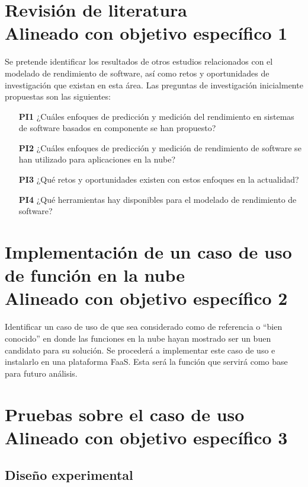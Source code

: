 ﻿\section[Revisión de literatura]{Revisión de literatura\\\small{Alineado con objetivo específico 1}}
Se pretende identificar los resultados de otros estudios relacionados con el modelado de rendimiento de software, así como retos y oportunidades de investigación que existan en esta área. Las preguntas de investigación inicialmente propuestas son las siguientes:
\begin{itemize}
    \item[\textbf{PI1}] ¿Cuáles enfoques de predicción y medición del rendimiento en sistemas de software basados en componente se han propuesto?
    \item[\textbf{PI2}] ¿Cuáles enfoques de predicción y medición de rendimiento de software se han utilizado para aplicaciones en la nube?
    \item[\textbf{PI3}] ¿Qué retos y oportunidades existen con estos enfoques en la actualidad?
    \item[\textbf{PI4}] ¿Qué herramientas hay disponibles para el modelado de rendimiento de software?
\end{itemize}

\section[Implementación de caso de uso de función en la nube]{Implementación de un caso de uso de función en la nube\\\small{Alineado con objetivo específico 2}}

Identificar un caso de uso de que sea considerado como de referencia o ``bien conocido'' en donde las funciones en la nube hayan mostrado ser un buen candidato para su solución. Se procederá a implementar este caso de uso e instalarlo en una plataforma FaaS. Esta será la función que servirá como base para futuro análisis.

\section[Pruebas sobre el caso de uso]{Pruebas sobre el caso de uso\\\small{Alineado con objetivo específico 3}}

\subsection{Diseño experimental}

